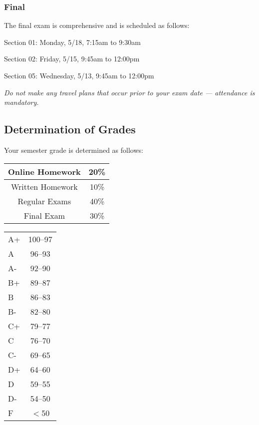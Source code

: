 \documentclass[letterpaper,12pt,fleqn]{article}
\begin{document}
\subsubsection*{Final}

The final exam is comprehensive and is scheduled as follows:
\begin{description}
  \bfseries
\item{Section 01:} Monday, 5/18, 7:15am to 9:30am
\item{Section 02:} Friday, 5/15, 9:45am to 12:00pm
\item{Section 05:} Wednesday, 5/13, 9:45am to 12:00pm
\end{description}
\emph{Do not make any travel plans that occur prior to your exam date --- attendance is mandatory.}

\subsection*{Determination of Grades}

Your semester grade is determined as follows:

\bigskip

\begin{center}
  \begin{minipage}{2.5in}
    \centering
    \begin{tabular}{|c|c|}
      \hline
      Online Homework & 20\% \\
      \hline
      Written Homework & 10\% \\
      \hline
      Regular Exams & 40\% \\
      \hline
      Final Exam & 30\% \\
      \hline
    \end{tabular}
  \end{minipage}
  \begin{minipage}{2.5in}
    \centering
    \begin{tabular}{|l|c|}
      \hline
      A+ & 100--97 \\
      A & 96--93 \\
      A- & 92--90 \\
      B+ & 89--87 \\
      B & 86--83 \\
      B- & 82--80 \\
      C+ & 79--77 \\
      C & 76--70 \\
      C- & 69--65 \\
      D+ & 64--60 \\
      D & 59--55 \\
      D- & 54--50 \\
      F & \(<\)50 \\
      \hline
    \end{tabular}
  \end{minipage}
\end{center}
\end{document}
